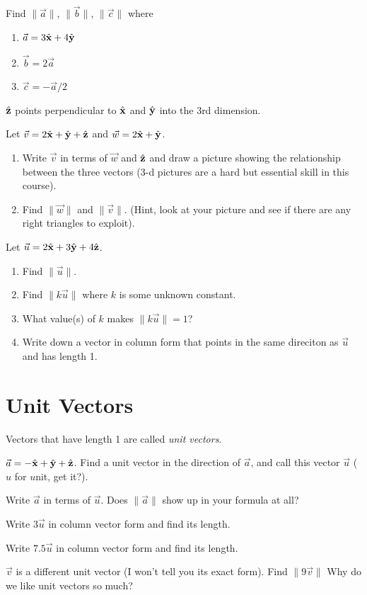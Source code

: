 \documentclass[letter]{article}
\newcommand{\xh}{\hat{\bf x}}
\newcommand{\yh}{\hat{\bf y}}
\newcommand{\zh}{\hat{\bf z}}
\begin{document}
	\begin{Enum}
		\item Find $\|\vec a\|$, $\|\vec b\|$, $\|\vec c\|$ where
		\begin{enumerate}
			\item $\vec a=3\xh+4\yh$
			\item $\vec b=2\vec a$
			\item $\vec c = -\vec a/2$
		\end{enumerate}
		\item $\zh$ points perpendicular to $\xh$ and $\yh$ into the 3rd dimension.
		
		Let $\vec v=2\xh+\yh+\zh$ and $\vec w=2\xh+\yh$.
		\begin{enumerate}
			\item Write $\vec v$ in terms of $\vec w$ and $\zh$
			and draw a picture showing the relationship between the three vectors
			(3-d pictures are a hard but essential skill in this course).
			\item Find $\|\vec w\|$ and $\|\vec v\|$.  (Hint, look at your picture
			and see if there are any right triangles to exploit).
		\end{enumerate}
		\item Let $\vec u=2\xh+3\yh+4\zh$.
		\begin{enumerate}
			\item Find $\|\vec u\|$.
			\item Find $\|k\vec u\|$ where $k$ is some unknown constant.
			\item What value(s) of $k$ makes $\|k\vec u\|=1$?
			\item Write down a vector in column form that points in the same direciton
			as $\vec u$ and has length 1.
		\end{enumerate}
	\end{Enum}

\section*{Unit Vectors}
	Vectors that have length 1 are called \emph{unit vectors}.
	\begin{Enum}
		\item $\vec a=-\xh+\yh+\zh$.  Find a unit vector in the direction of $\vec a$,
		and call this vector $\vec u$ ($u$ for $u$nit, get it?).
		\item Write $\vec a$ in terms of $\vec u$.  Does $\|\vec a\|$ show up in your formula at all?
		\item Write $3\vec u$ in column vector form and find its length.
		\item Write $7.5\vec u$ in column vector form and find its length.
		\item $\vec v$ is a different unit vector (I won't tell you its exact form).  Find $\|9\vec v\|$
		Why do we like unit vectors so much?
	\end{Enum}
\end{document}
